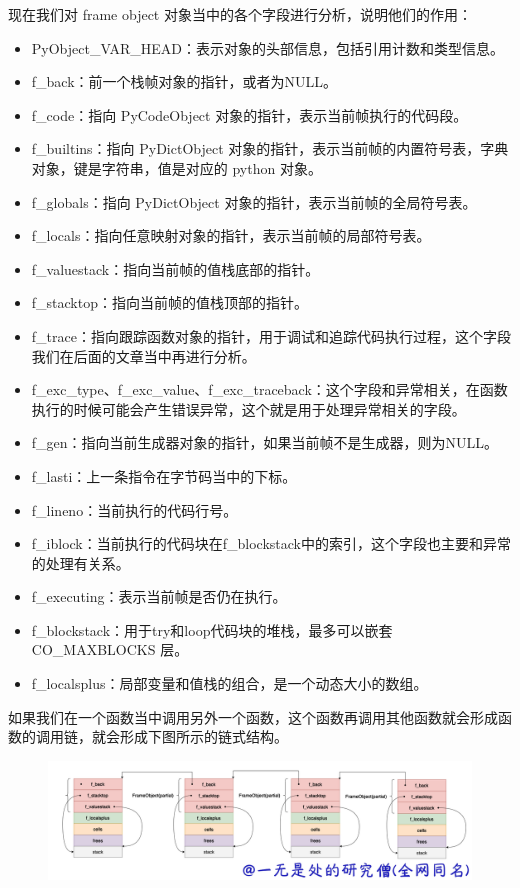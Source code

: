 现在我们对 frame object 对象当中的各个字段进行分析，说明他们的作用：
\begin{itemize}
\item PyObject\_VAR\_HEAD：表示对象的头部信息，包括引用计数和类型信息。 
\item f\_back：前一个栈帧对象的指针，或者为NULL。 
\item f\_code：指向 PyCodeObject 对象的指针，表示当前帧执行的代码段。 
\item f\_builtins：指向 PyDictObject 对象的指针，表示当前帧的内置符号表，字典对象，键是字符串，值是对应的 python 对象。 
\item f\_globals：指向 PyDictObject 对象的指针，表示当前帧的全局符号表。 
\item f\_locals：指向任意映射对象的指针，表示当前帧的局部符号表。 
\item f\_valuestack：指向当前帧的值栈底部的指针。 
\item f\_stacktop：指向当前帧的值栈顶部的指针。 
\item f\_trace：指向跟踪函数对象的指针，用于调试和追踪代码执行过程，这个字段我们在后面的文章当中再进行分析。 
\item f\_exc\_type、f\_exc\_value、f\_exc\_traceback：这个字段和异常相关，在函数执行的时候可能会产生错误异常，这个就是用于处理异常相关的字段。 
\item f\_gen：指向当前生成器对象的指针，如果当前帧不是生成器，则为NULL。 
\item f\_lasti：上一条指令在字节码当中的下标。 
\item f\_lineno：当前执行的代码行号。 
\item f\_iblock：当前执行的代码块在f\_blockstack中的索引，这个字段也主要和异常的处理有关系。 
\item f\_executing：表示当前帧是否仍在执行。 
\item f\_blockstack：用于try和loop代码块的堆栈，最多可以嵌套 CO\_MAXBLOCKS 层。 
\item f\_localsplus：局部变量和值栈的组合，是一个动态大小的数组。 
\end{itemize}
如果我们在一个函数当中调用另外一个函数，这个函数再调用其他函数就会形成函数的调用链，就会形成下图所示的链式结构。

    \begin{figure}[H]
        \centering
            \includegraphics[scale=.25]{images/72-frame.png}
						\caption{ }
        \label{fig:my_label}
    \end{figure}
    

